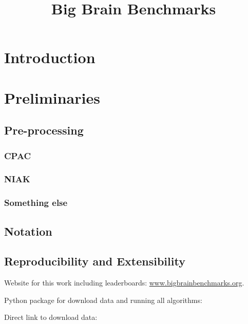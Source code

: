 \documentclass[12pt]{article}
\title{\vspace{-75pt}Big Brain Benchmarks}
\author{}
\date{}
\begin{document}
{\vspace{-100pt}
\maketitle
}\setcounter{tocdepth}{2}
\tableofcontents

\begin{abstract}
\end{abstract}

\newpage
\section{Introduction}

\section{Preliminaries} \label{sec:methods}

\subsection{Pre-processing}


\subsubsection{CPAC}


\subsubsection{NIAK}


\subsubsection{Something else}


\subsection{Notation}



\subsection{Reproducibility and Extensibility}


Website for this work including leaderboards: \url{www.bigbrainbenchmarks.org}.

Python package for download data and running all algorithms: 

Direct link to download data:
\end{document}
